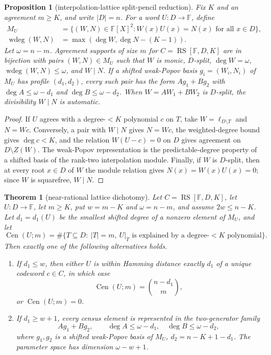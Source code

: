 \documentclass[a4paper,11pt]{amsart}
\newtheorem{theorem}{Theorem}[section]
\newtheorem{proposition}[proposition]{Proposition}
\theoremstyle{remark}
\newcommand{\F}{\mathbb F}
\newcommand{\RS}{\operatorname{RS}}
\newcommand{\wdeg}{\operatorname{wdeg}}
\newcommand{\Cen}{\operatorname{Cen}}
\begin{document}
\begin{proposition}[interpolation-lattice split-pencil reduction]\label{prop:lattice-split}
Fix \(K\) and an agreement \(m\ge K\), and write \(|D|=n\).  For a word \(U:D\to\F\), define
\begin{align*}
        M_U&=\{(W,N)\in\F[X]^2:
        W(x)U(x)=N(x)\text{ for all }x\in D\},\\
        \wdeg(W,N)&=\max(\deg W,\deg N-(K-1)).
\end{align*}
Let \(\omega=n-m\).  Agreement supports of size \(m\) for \(C=\RS[\F,D,K]\) are in bijection with pairs \((W,N)\in M_U\) such that \(W\) is monic, \(D\)-split, \(\deg W=\omega\), \(\wdeg(W,N)\le\omega\), and \(W\mid N\).  If a shifted weak-Popov basis \(g_i=(W_i,N_i)\) of \(M_U\) has profile \((d_1,d_2)\), every such pair has the form \(Ag_1+Bg_2\) with \(\deg A\le\omega-d_1\) and \(\deg B\le\omega-d_2\).  When \(W=AW_1+BW_2\) is \(D\)-split, the divisibility \(W\mid N\) is automatic.
\end{proposition}

\begin{proof}
If \(U\) agrees with a degree-\(<K\) polynomial \(c\) on \(T\), take \(W=\ell_{D\setminus T}\) and \(N=Wc\).  Conversely, a pair with \(W\mid N\) gives \(N=Wc\), the weighted-degree bound gives \(\deg c<K\), and the relation \(W(U-c)=0\) on \(D\) gives agreement on \(D\setminus Z(W)\).  The weak-Popov representation is the predictable-degree property of a shifted basis of the rank-two interpolation module.  Finally, if \(W\) is \(D\)-split, then at every root \(x\in D\) of \(W\) the module relation gives \(N(x)=W(x)U(x)=0\); since \(W\) is squarefree, \(W\mid N\).
\end{proof}

\begin{theorem}[near-rational lattice dichotomy]\label{thm:near-rational}
Let \(C=\RS[\F,D,K]\), let \(U:D\to\F\), let \(m\ge K\), put \(w=m-K\) and \(\omega=n-m\), and assume \(2w\le n-K\).  Let \(d_1=d_1(U)\) be the smallest shifted degree of a nonzero element of \(M_U\), and let
\[
        \Cen(U;m)=\#\{T\subseteq D:\ |T|=m,\ U|_T\text{ is explained by a degree-}<K\text{ polynomial}\}.
\]
Then exactly one of the following alternatives holds.
\begin{enumerate}[label=\textup{(\roman*)}]
\item If \(d_1\le w\), then either \(U\) is within Hamming distance exactly \(d_1\) of a unique codeword \(c\in C\), in which case
\[
        \Cen(U;m)=\binom{n-d_1}{m},
\]
or \(\Cen(U;m)=0\).
\item If \(d_1\ge w+1\), every census element is represented in the two-generator family
\[
        Ag_1+Bg_2,\qquad
        \deg A\le\omega-d_1,\quad \deg B\le\omega-d_2,
\]
where \(g_1,g_2\) is a shifted weak-Popov basis of \(M_U\), \(d_2=n-K+1-d_1\).  The parameter space has dimension \(\omega-w+1\).
\end{enumerate}
\end{theorem}
\end{document}
